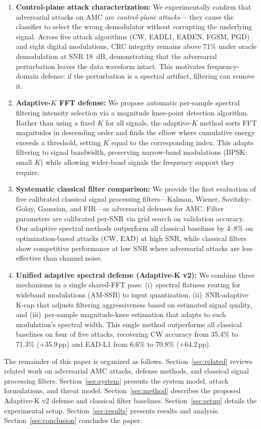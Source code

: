 \begin{enumerate}
\item \textbf{Control-plane attack characterization:} We experimentally
  confirm that adversarial attacks on AMC are \emph{control-plane attacks}---
  they cause the classifier to select the wrong demodulator without corrupting
  the underlying signal. Across five attack algorithms (CW, EADL1, EADEN,
  FGSM, PGD) and eight digital modulations, CRC integrity remains above 71\%
  under oracle demodulation at SNR 18~dB, demonstrating that the adversarial
  perturbation leaves the data waveform intact. This motivates frequency-domain
  defense: if the perturbation is a spectral artifact, filtering can remove it.

\item \textbf{Adaptive-$K$ FFT defense:} We propose automatic per-sample
  spectral filtering intensity selection via a magnitude knee-point detection
  algorithm. Rather than using a fixed $K$ for all signals, the adaptive-$K$
  method sorts FFT magnitudes in descending order and finds the elbow where
  cumulative energy exceeds a threshold, setting $K$ equal to the corresponding
  index. This adapts filtering to signal bandwidth, preserving narrow-band
  modulations (BPSK: small $K$) while allowing wider-band signals the
  frequency support they require.

\item \textbf{Systematic classical filter comparison:} We provide the first
  evaluation of five calibrated classical signal processing filters---Kalman,
  Wiener, Savitzky-Golay, Gaussian, and FIR---as adversarial defenses for AMC.
  Filter parameters are calibrated per-SNR via grid search on validation
  accuracy. Our adaptive spectral methods outperform all classical baselines
  by 4--8\% on optimization-based attacks (CW, EAD) at high SNR, while classical
  filters show competitive performance at low SNR where adversarial attacks are
  less effective than channel noise.

\item \textbf{Unified adaptive spectral defense (Adaptive-K v2):} We combine
  three mechanisms in a single shared-FFT pass: (i)~spectral flatness routing
  for wideband modulations (AM-SSB) to input quantization, (ii)~SNR-adaptive
  K-cap that adjusts filtering aggressiveness based on estimated signal
  quality, and (iii)~per-sample magnitude-knee estimation that adapts to each
  modulation's spectral width.  This single method outperforms all classical
  baselines on four of five attacks, recovering CW accuracy from 35.4\% to
  71.3\% (+35.9\,pp) and EAD-L1 from 6.6\% to 70.8\% (+64.2\,pp).
\end{enumerate}

The remainder of this paper is organized as follows. Section~\ref{sec:related}
reviews related work on adversarial AMC attacks, defense methods, and classical
signal processing filters. Section~\ref{sec:system} presents the system model,
attack formulations, and threat model. Section~\ref{sec:method} describes the
proposed Adaptive-K v2 defense and classical filter baselines. Section~\ref{sec:setup} details the
experimental setup. Section~\ref{sec:results} presents results and analysis.
Section~\ref{sec:conclusion} concludes the paper.
